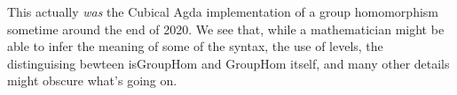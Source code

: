 \begin{code}
\AgdaSymbol{(}\AgdaSpace{}%
\AgdaSymbol{:}\AgdaSpace{}%
\AgdaSpace{}%
\AgdaSymbol{\{}\AgdaSymbol{\})}\AgdaSpace{}%
\AgdaSymbol{:}\AgdaSpace{}%
\AgdaSpace{}%
\AgdaSymbol{(}\AgdaSpace{}%
\AgdaSpace{}%
\AgdaSymbol{)}\AgdaSpace{}%
\<%
\\
\>[2][@{}l@{\AgdaIndent{0}}]%
\>[4]\AgdaSpace{}%
\<%
\\
%
\\[\AgdaEmptyExtraSkip]%
%
\>[4]\<%
\\
\>[4][@{}l@{\AgdaIndent{0}}]%
\>[6]\AgdaSpace{}%
\AgdaSymbol{:}\AgdaSpace{}%
\AgdaSpace{}%
\AgdaSpace{}%
\AgdaSpace{}%
\AgdaSpace{}%
\AgdaSpace{}%
\AgdaSpace{}%
\<%
\\
%
\>[6]\AgdaSpace{}%
\AgdaSymbol{:}\AgdaSpace{}%
\AgdaSpace{}%
\AgdaSpace{}%
\AgdaSpace{}%
\<%
\end{code}
This actually \emph{was} the Cubical Agda implementation of a group homomorphism
sometime around the end of 2020. We see that, while a mathematician might be
able to infer the meaning of some of the syntax, the use of levels, the
distinguising bewteen isGroupHom and GroupHom itself, and many other details
might obscure what's going on.

